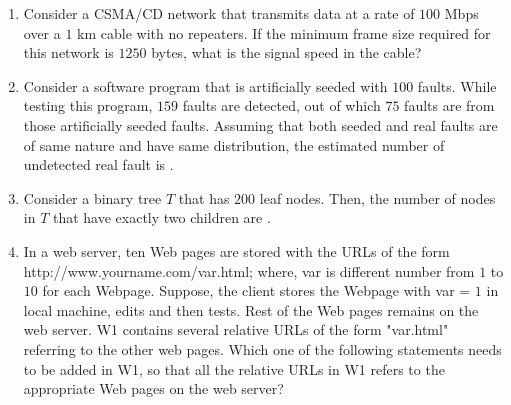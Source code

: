 \documentclass[journal,12pt,onecolumn]{IEEEtran}
\theoremstyle{remark}
\begin{document}
\begin{enumerate}
				\item Consider a CSMA/CD network that transmits data at a rate of $100$ Mbps  over a $1$ km cable with no repeaters. If the minimum frame size required for this network is $1250$ bytes, what is the signal speed  in the cable?
				
				\hfill{}
				
				\begin{enumerate}
				\end{enumerate}
				
				\item Consider a software program that is artificially seeded with $100$ faults. While testing this program, $159$ faults are detected, out of which $75$ faults are from those artificially seeded faults. Assuming that both seeded and real faults are of same nature and have same distribution, the estimated number of undetected real fault is \underline{\hspace{2cm}}.
				
				\hfill{}
				
				\item Consider a binary tree $T$ that has $200$ leaf nodes. Then, the number of nodes in $T$ that have exactly two children are \underline{\hspace{2cm}}.
				
				\hfill{}
				
				\item In a web server, ten Web pages are stored with the URLs of the form http://www.yourname.com/var.html; where, var is different number from $1$ to $10$ for each Webpage. Suppose, the client stores the Webpage with var = $1$ in local machine, edits and then tests. Rest of the Web pages remains on the web server. W1 contains several relative URLs of the form "var.html" referring to the other web pages. Which one of the following statements needs to be added in W1, so that all the relative URLs in W1 refers to the appropriate Web pages on the web server?
				

\end{enumerate}
\end{document}
